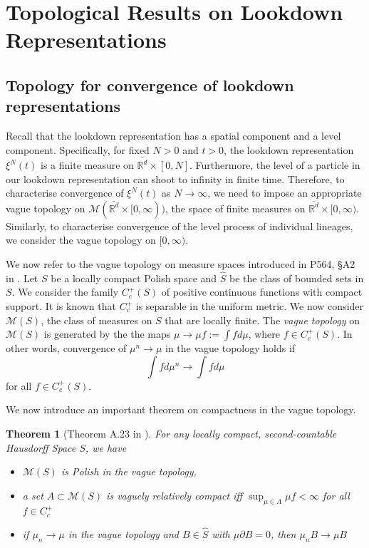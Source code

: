 \documentclass[12pt]{article}
\newtheorem{theorem}{Theorem}[section]
\def \hat{\widehat}
\begin{document}
\section{Topological Results on Lookdown Representations}
\label{sec: Topologies on Lookdown}
\subsection{Topology for convergence of lookdown representations}

Recall that
the lookdown representation has a spatial component and a level component.
Specifically, for fixed $N>0$ and $t>0$,
the lookdown representation $\xi^N(t)$ 
is a finite measure on $\overline{\mathbb{R}^d} \times [0,N]$.
Furthermore, the level of a particle in our lookdown representation can shoot to infinity in finite time.
Therefore, to characterise convergence of $\xi^N(t)$ as $N \to \infty$,
we need to impose an appropriate vague topology on $\mathcal{M}(\overline{\mathbb{R}^d} \times [0,\infty))$,
the space of finite measures on $\overline{\mathbb{R}^d} \times [0,\infty)$.
Similarly, to characterise convergence of the level process of individual lineages, we consider the vague topology on $[0,\infty)$.



We now refer to the vague topology on measure spaces introduced in P564, \S A2 in \cite{kallenberg1997foundations}.
Let $S$ be a locally compact Polish space and $\hat{S}$ be the class of bounded sets in $S$.
We consider the family $C^{+}_c(S)$ of positive continuous functions with compact support. It is known that $C^{+}_c$ is separable in the uniform metric.
We now consider $\mathcal{M}(S)$, the class of measures on $S$ that are locally finite.
The \textit{vague topology} on $\mathcal{M}(S)$ is generated by the the maps $\mu \to \mu f := \int f d \mu$, where $f\in C^{+}_{c}(S)$.
In other words, convergence of $\mu^n \to \mu$ in the vague topology holds if 
$$\int f d\mu^n \to \int f d\mu$$
for all $f\in C^{+}_{c}(S)$.

We now introduce an important theorem on compactness in the vague topology.
\begin{theorem}[Theorem A.23 in \cite{kallenberg1997foundations}]
For any locally compact, second-countable Hausdorff Space $S$, 
we have
\begin{itemize}
\item $\mathcal{M}(S)$ is Polish in the vague topology,
\item a set $A\subset \mathcal{M}(S)$ is vaguely relatively compact iff $\sup_{\mu\in A} \mu f < \infty$ for all $f \in C^{+}_{c}$
\item if $\mu_n \to \mu$ in the vague topology and $B \in \hat{S}$ with $\mu \partial B = 0$, then $\mu_n B \to \mu B$
\end{itemize}
\end{theorem}
\end{document}
